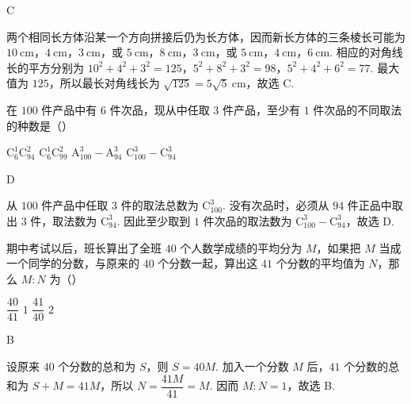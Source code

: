 \begin{answer}
C
\end{answer}

\begin{solution}
两个相同长方体沿某一个方向拼接后仍为长方体，因而新长方体的三条棱长可能为 \(10\mathrm{~cm}\)，\(4\mathrm{~cm}\)，\(3\mathrm{~cm}\)，或 \(5\mathrm{~cm}\)，\(8\mathrm{~cm}\)，\(3\mathrm{~cm}\)，或 \(5\mathrm{~cm}\)，\(4\mathrm{~cm}\)，\(6\mathrm{~cm}\). 相应的对角线长的平方分别为 \(10^{2}+4^{2}+3^{2}=125\)，\(5^{2}+8^{2}+3^{2}=98\)，\(5^{2}+4^{2}+6^{2}=77\). 最大值为 \(125\)，所以最长对角线长为 \(\sqrt{125}=5\sqrt5\mathrm{~cm}\)，故选 C.
\end{solution}


\begin{problem}
在 \(100\) 件产品中有 \(6\) 件次品，现从中任取 \(3\) 件产品，至少有 \(1\) 件次品的不同取法的种数是（\quad）

\choices
    {\(\mathrm C_{6}^{1}\mathrm C_{94}^{2}\)}
    {\(\mathrm C_{6}^{1}\mathrm C_{99}^{2}\)}
    {\(\mathrm A_{100}^{3}-\mathrm A_{94}^{3}\)}
    {\(\mathrm C_{100}^{3}-\mathrm C_{94}^{3}\)}
\end{problem}

\begin{answer}
D
\end{answer}

\begin{solution}
从 \(100\) 件产品中任取 \(3\) 件的取法总数为 \(\mathrm C_{100}^{3}\). 没有次品时，必须从 \(94\) 件正品中取出 \(3\) 件，取法数为 \(\mathrm C_{94}^{3}\). 因此至少取到 \(1\) 件次品的取法数为 \(\mathrm C_{100}^{3}-\mathrm C_{94}^{3}\)，故选 D.
\end{solution}


\begin{problem}
期中考试以后，班长算出了全班 \(40\) 个人数学成绩的平均分为 \(M\)，如果把 \(M\) 当成一个同学的分数，与原来的 \(40\) 个分数一起，算出这 \(41\) 个分数的平均值为 \(N\)，那么 \(M:N\) 为（\quad）

\choices
    {\(\dfrac{40}{41}\)}
    {\(1\)}
    {\(\dfrac{41}{40}\)}
    {\(2\)}
\end{problem}

\begin{answer}
B
\end{answer}

\begin{solution}
设原来 \(40\) 个分数的总和为 \(S\)，则 \(S=40M\). 加入一个分数 \(M\) 后，\(41\) 个分数的总和为 \(S+M=41M\)，所以 \(N=\dfrac{41M}{41}=M\). 因而 \(M:N=1\)，故选 B.
\end{solution}


